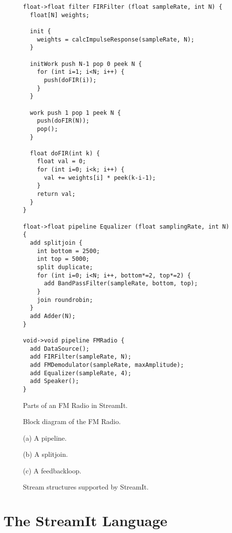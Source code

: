 \begin{figure}[t]
\scriptsize
\begin{verbatim}
float->float filter FIRFilter (float sampleRate, int N) {
  float[N] weights;

  init {
    weights = calcImpulseResponse(sampleRate, N);
  }

  initWork push N-1 pop 0 peek N {
    for (int i=1; i<N; i++) {
      push(doFIR(i));
    }
  }

  work push 1 pop 1 peek N {
    push(doFIR(N));
    pop();
  }

  float doFIR(int k) {
    float val = 0;
    for (int i=0; i<k; i++) {
      val += weights[i] * peek(k-i-1);
    }
    return val;
  }
}

float->float pipeline Equalizer (float samplingRate, int N) {
  add splitjoin {
    int bottom = 2500;
    int top = 5000;
    split duplicate;
    for (int i=0; i<N; i++, bottom*=2, top*=2) {
      add BandPassFilter(sampleRate, bottom, top);
    }
    join roundrobin;
  }
  add Adder(N);
}

void->void pipeline FMRadio {
  add DataSource();
  add FIRFilter(sampleRate, N);
  add FMDemodulator(sampleRate, maxAmplitude);
  add Equalizer(sampleRate, 4);
  add Speaker();
}
\end{verbatim}
\caption{Parts of an FM Radio in StreamIt.
\protect\label{fig:radiocode}}
\end{figure}

\begin{figure}[t]
\hspace{0.1in}
\caption{Block diagram of the FM Radio.
\protect\label{fig:radio-ascoded}}
\vspace{0.8in}
\vspace{10pt}

(a) A pipeline. \\
\vspace{10pt}

(b) A splitjoin. \\
\vspace{10pt}

(c) A feedbackloop. \\
\caption{Stream structures supported by StreamIt.
\protect\label{fig:structures}}
\end{figure}

\section{The StreamIt Language}
\label{sec:streamit}


